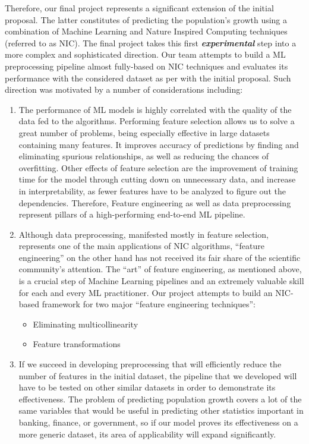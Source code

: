 \documentclass[conference]{IEEEtran}
\begin{document}
Therefore, our final project represents a significant extension of the initial proposal. The latter constitutes of predicting the population’s growth using a combination of Machine Learning and Nature Inspired Computing techniques (referred to as NIC). The final project takes this first \emph{\textbf{experimental}} step into a more complex and sophisticated direction. Our team attempts to build a ML preprocessing pipeline almost fully-based on NIC techniques and evaluates its performance with the considered dataset as per with the initial proposal. Such direction was motivated by a number of considerations including:
\begin{enumerate}
	\item The performance of ML models is highly correlated with the quality of the data fed to the algorithms. Performing feature selection allows us to solve a great number of problems, being especially effective in large datasets containing many features. It improves accuracy of predictions by finding and eliminating spurious relationships, as well as reducing the chances of overfitting. Other effects of feature selection are the improvement of training time for the model through cutting down on unnecessary data, and increase in interpretability, as fewer features have to be analyzed to figure out the dependencies. Therefore, Feature engineering as well as data preprocessing represent pillars of a high-performing end-to-end ML pipeline.
	\item Although data preprocessing, manifested mostly in feature selection, represents one of the main applications of NIC algorithms, “feature engineering” on the other hand has not received its fair share of the scientific community’s attention. The “art” of feature engineering, as mentioned above, is a crucial step of Machine Learning pipelines and an extremely valuable skill for each and every ML practitioner. Our project attempts to build an NIC-based framework for two major “feature engineering techniques”:
	\begin{itemize}
		\item Eliminating multicollinearity
		\item Feature transformations
	\end{itemize}
	\item If we succeed in developing preprocessing that will efficiently reduce the number of features in the initial dataset, the pipeline that we developed will have to be tested on other similar datasets in order to demonstrate its effectiveness. The problem of predicting population growth covers a lot of the same variables that would be useful in predicting other statistics important in banking, finance, or government, so if our model proves its effectiveness on a more generic dataset, its area of applicability will expand significantly.\\
	
\end{enumerate}
\end{document}
